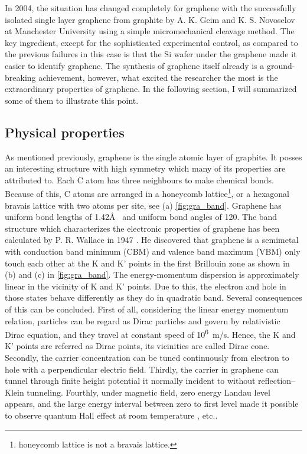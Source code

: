 In 2004, the situation has changed completely for graphene with the successfully isolated single layer graphene from graphite by A. K. Geim and K. S. Novoselov at Manchester University using a simple micromechanical cleavage method. The key ingredient, except for the sophisticated experimental control, as compared to the previous failures\cite{Krishnan1997,Ohashi1997} in this case is that the Si wafer under the graphene made it easier to identify graphene\cite{Geim2007}. The synthesis of graphene itself already is a ground-breaking achievement, however, what excited the researcher the most is the extraordinary properties of graphene. In the following section, I will summarized some of them to illustrate this point.

\subsection{Physical properties}

As mentioned previously, graphene is the single atomic layer of graphite. It posses an interesting structure with high symmetry which many of its properties are attributed to. Each C atom has three neighbours to make chemical bonds. Because of this, C atoms are arranged in a honeycomb lattice\footnote{honeycomb lattice is not a bravais lattice.}, or a hexagonal bravais lattice with two atoms per site, see (a) \autoref{fig:gra_band}. Graphene has uniform bond lengths of 1.42\AA~ and uniform bond angles of 120\textdegree. The band structure which characterizes the electronic properties of graphene has been calculated by P. R. Wallace in 1947 \cite{Wallace1947}. He discovered that graphene is a semimetal with conduction band minimum (CBM) and valence band maximum (VBM) only touch each other at the K and K' points in the first Brillouin zone as shown in (b) and (c) in \autoref{fig:gra_band}. The energy-momentum dispersion is approximately linear in the vicinity of K and K' points. Due to this, the electron and hole in those states behave differently as they do in quadratic band. Several consequences of this can be concluded. First of all, considering the linear energy momentum relation, particles can be regard as Dirac particles and govern by relativistic Dirac equation\cite{Novoselov2005}, and they travel at constant speed of \si{10^6m/s}. Hence, the K and K' points are referred as Dirac points, its vicinities are called Dirac cone. Secondly, the carrier concentration can be tuned continuously from electron to hole with a perpendicular electric field\cite{Geim2007}. Thirdly, the carrier in graphene can tunnel through finite height potential it normally incident to without reflection--Klein tunneling\cite{Katsnelson2006}. Fourthly, under magnetic field, zero energy Landau level appears, and the large energy interval between zero to first level made it possible to observe quantum Hall effect at room temperature \cite{Novoselov1379}, etc..

